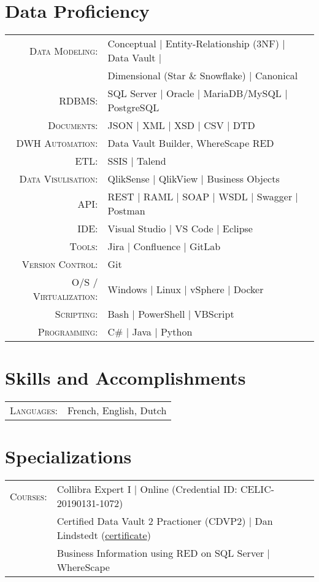 \documentclass[a4paper,10pt]{article}
\begin{document}
\section{Data Proficiency}
\begin{tabular}{rl}
  \textsc{Data Modeling:}& Conceptual | Entity-Relationship (3NF) | Data Vault | \\
  &Dimensional (Star \& Snowflake) | Canonical \\
  \textsc{RDBMS:}& SQL Server | Oracle | MariaDB/MySQL | PostgreSQL \\
  \textsc{Documents:}& JSON | XML | XSD | CSV | DTD \\
  \textsc{DWH Automation:}& Data Vault Builder, WhereScape RED \\
  \textsc{ETL:}& SSIS | Talend\\
  \textsc{Data Visulisation:}& QlikSense | QlikView | Business Objects \\
  \textsc{API:}& REST | RAML | SOAP | WSDL | Swagger | Postman\\
  \textsc{IDE:}& Visual Studio | VS Code | Eclipse\\
  \textsc{Tools:}& Jira | Confluence | GitLab\\
  \textsc{Version Control:}& Git \\
  \textsc{O/S / Virtualization:}& Windows | Linux | vSphere | Docker\\
  \textsc{Scripting}:&Bash | PowerShell | VBScript \\
  \textsc{Programming}:&C\# | Java | Python\\
\end{tabular}

\section{Skills and Accomplishments}
\begin{tabular}{rl}
  \textsc{Languages:}& French, English, Dutch\\
\end{tabular}

\section{Specializations}
\begin{tabular}{rl}
  \textsc{Courses:}
  &Collibra Expert I | Online (Credential ID: CELIC-20190131-1072)\\
  &Certified Data Vault 2 Practioner (CDVP2) | Dan Lindstedt (\href{http://keyldv.com/}{certificate})\\
  &Business Information using RED on SQL Server | WhereScape
\end{tabular}
\end{document}
